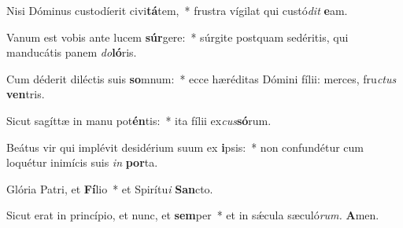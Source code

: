 \item Nisi Dóminus custodíerit civi\textbf{tá}tem,~* frustra vígilat qui custó\textit{dit} \textbf{e}am.
\item Vanum est vobis ante lucem \textbf{súr}gere:~* súrgite postquam sedéritis, qui manducátis panem \textit{do}\textbf{ló}ris.
\item Cum déderit diléctis suis \textbf{so}mnum:~* ecce hæréditas Dómini fílii: merces, fru\hspace*{0.03em}\textit{ctus} \textbf{ven}tris.
\item Sicut sagíttæ in manu pot\textbf{én}tis:~* ita fílii ex\hspace*{0.03em}\textit{cus}\textbf{só}rum.
\item Beátus vir qui implévit desidérium suum ex \textbf{i}psis:~* non confundétur cum loquétur inimícis suis \textit{in} \textbf{por}ta.
\item Glória Patri, et \textbf{Fí}lio~* et Spirítu\hspace*{0.03em}\textit{i} \textbf{San}cto.
\item Sicut erat in princípio, et nunc, et \textbf{sem}per~* et in sǽcula sæculó\textit{rum.} \textbf{A}men.